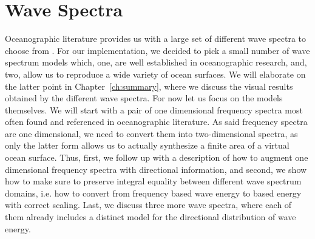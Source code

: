 \section{Wave Spectra}
\label{sec:wave_spectra}
Oceanographic literature provides us with a large set of different wave spectra
to choose from \citep{Komen:1996}. For our implementation, we decided to pick a
small number of wave spectrum models which, one, are well established in
oceanographic research, and, two, allow us to reproduce a wide variety of ocean
surfaces. We will elaborate on the latter point in Chapter~\ref{ch:summary},
where we discuss the visual results obtained by the different wave spectra.
For now let us focus on the models themselves.
We will start with a pair of one dimensional frequency spectra most often found
and referenced in oceanographic literature. As said frequency spectra are
one dimensional, we need to convert them into two-dimensional \wavenumber
spectra, as only the latter form allows us to actually synthesize a finite area
of a virtual ocean surface. Thus, first, we follow up with a description of how
to augment one dimensional frequency spectra with directional information, and
second, we show how to make sure to preserve integral equality between
different wave spectrum domains, i.e. how to convert from frequency based wave
energy to \wavenumber based energy with correct scaling.
Last, we discuss three more wave spectra, where each of them already includes a
distinct model for the directional distribution of wave energy.
% 
% 
%
